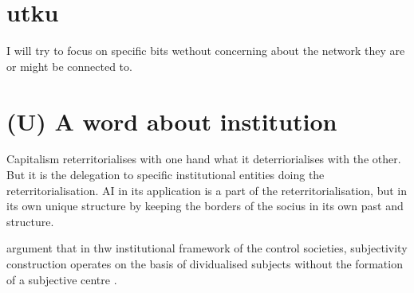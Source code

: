 
%

\section{utku}
I will try to focus on specific bits wethout concerning about the network they
are or might be connected to.


\section{(U) A word about institution}
Capitalism reterritorialises with one hand what it deterriorialises with the
other. But it is the delegation to specific institutional entities doing the
reterritorialisation. AI in its application is a part of the
reterritorialisation, but in its own unique structure by keeping the borders of
the socius in its own past and structure.

\cite{mackenzie2021} argument that in thw institutional framework of the
control societies, subjectivity construction operates on the basis of
dividualised subjects without the formation of a subjective centre \parencite[14]{mackenzie2021}.

